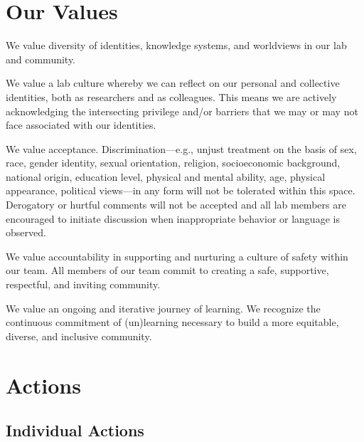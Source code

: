 \documentclass[
]{book}
\begin{document}
\hypertarget{values}{%
\section*{Our Values}\label{values}}

We value diversity of identities, knowledge systems, and worldviews in our lab and community.

We value a lab culture whereby we can reflect on our personal and collective identities, both as researchers and as colleagues. This means we are actively acknowledging the intersecting privilege and/or barriers that we may or may not face associated with our identities.

We value acceptance. Discrimination---e.g., unjust treatment on the basis of sex, race, gender identity, sexual orientation, religion, socioeconomic background, national origin, education level, physical and mental ability, age, physical appearance, political views---in any form will not be tolerated within this space. Derogatory or hurtful comments will not be accepted and all lab members are encouraged to initiate discussion when inappropriate behavior or language is observed.

We value accountability in supporting and nurturing a culture of safety within our team. All members of our team commit to creating a safe, supportive, respectful, and inviting community.

We value an ongoing and iterative journey of learning. We recognize the continuous commitment of (un)learning necessary to build a more equitable, diverse, and inclusive community.

\hypertarget{ediactions}{%
\section*{Actions}\label{ediactions}}

\hypertarget{individualactions}{%
\subsection*{Individual Actions}\label{individualactions}}
\end{document}

